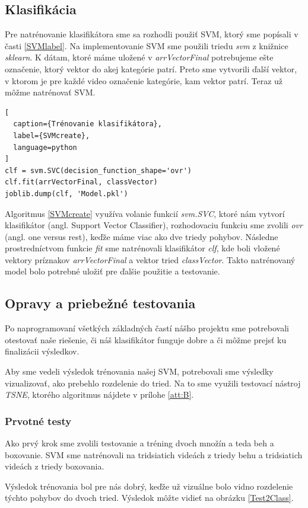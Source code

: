 \subsection{Klasifikácia}
Pre natrénovanie klasifikátora sme sa rozhodli použiť SVM, ktorý sme popísali v časti \ref{SVMlabel}. Na implementovanie SVM sme použili triedu \textit{svm} z knižnice \textit{sklearn}. K dátam, ktoré máme uložené v \textit{arrVectorFinal} potrebujeme ešte označenie, ktorý vektor do akej kategórie patrí. Preto sme vytvorili ďalší vektor, v ktorom je pre každé video označenie kategórie, kam vektor patrí. Teraz už môžme natrénovať SVM. 
\hfill \break
\begin{lstlisting}[
  caption={Trénovanie klasifikátora},
  label={SVMcreate},
  language=python
]
clf = svm.SVC(decision_function_shape='ovr')
clf.fit(arrVectorFinal, classVector)
joblib.dump(clf, 'Model.pkl') 
\end{lstlisting}
Algoritmus \ref{SVMcreate} využíva volanie funkcií \textit{svm.SVC}, ktoré nám vytvorí klasifikátor (angl. Support Vector Classifier), rozhodovaciu funkciu sme zvolili \textit{ovr} (angl. one versus rest), keďže máme viac ako dve triedy pohybov. Následne prostredníctvom funkcie \textit{fit} sme natrénovali klasifikátor \textit{clf}, kde boli vložené vektory príznakov \textit{arrVectorFinal} a vektor tried \textit{classVector}. Takto natrénovaný model bolo potrebné uložiť pre ďalšie použitie a testovanie. 

\subsection{Opravy a priebežné testovania}
Po naprogramovaní všetkých základných častí nášho projektu sme potrebovali otestovať naše riešenie, či náš klasifikátor funguje dobre a či môžme prejsť ku finalizácii výsledkov. 

Aby sme vedeli výsledok trénovania našej SVM, potrebovali sme výsledky vizualizovať, ako prebehlo rozdelenie do tried. Na to sme využili testovací nástroj \textit{TSNE}, ktorého algoritmus nájdete v prílohe \ref{att:B}.

\subsubsection{Prvotné testy}
Ako prvý krok sme zvolili testovanie a tréning dvoch množín a teda beh a boxovanie. SVM sme natrénovali na tridsiatich videách z triedy behu a tridsiatich videách z triedy boxovania. 

Výsledok trénovania bol pre nás dobrý, keďže už vizuálne bolo vidno rozdelenie týchto pohybov do dvoch tried. Výsledok môžte vidieť na obrázku \ref{Test2Class}.

